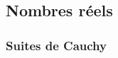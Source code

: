 %
%
%
%
%
%
%    
%
%
%
%
%
%
%
%
%
%

\subsection{Nombres réels}

\subsubsection{Suites de Cauchy}

